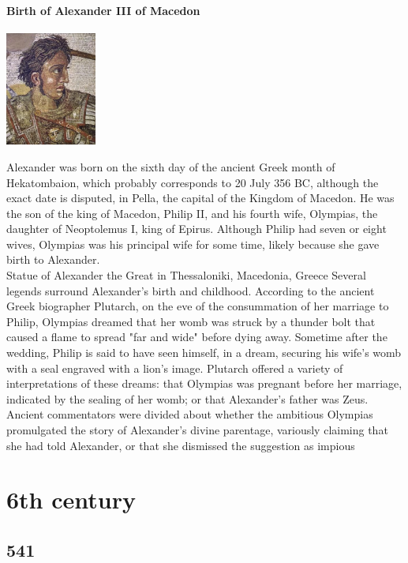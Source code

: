 \documentclass[11pt]{report}
\begin{document}
\subsection{Birth of Alexander III of Macedon}
\vspace{2mm}\begin{center}\includegraphics[width=3cm]{./img/alexanderTG.jpg}\end{center}
Alexander was born on the sixth day of the ancient Greek month of Hekatombaion, which probably corresponds to 20 July 356 BC, although the exact date is disputed, in Pella, the capital of the Kingdom of Macedon. He was the son of the king of Macedon, Philip II, and his fourth wife, Olympias, the daughter of Neoptolemus I, king of Epirus. Although Philip had seven or eight wives, Olympias was his principal wife for some time, likely because she gave birth to Alexander.\\
Statue of Alexander the Great in Thessaloniki, Macedonia, Greece
Several legends surround Alexander's birth and childhood. According to the ancient Greek biographer Plutarch, on the eve of the consummation of her marriage to Philip, Olympias dreamed that her womb was struck by a thunder bolt that caused a flame to spread "far and wide" before dying away. Sometime after the wedding, Philip is said to have seen himself, in a dream, securing his wife's womb with a seal engraved with a lion's image. Plutarch offered a variety of interpretations of these dreams: that Olympias was pregnant before her marriage, indicated by the sealing of her womb; or that Alexander's father was Zeus. Ancient commentators were divided about whether the ambitious Olympias promulgated the story of Alexander's divine parentage, variously claiming that she had told Alexander, or that she dismissed the suggestion as impious


\part{6th century}
\chapter{541}
\end{document}
